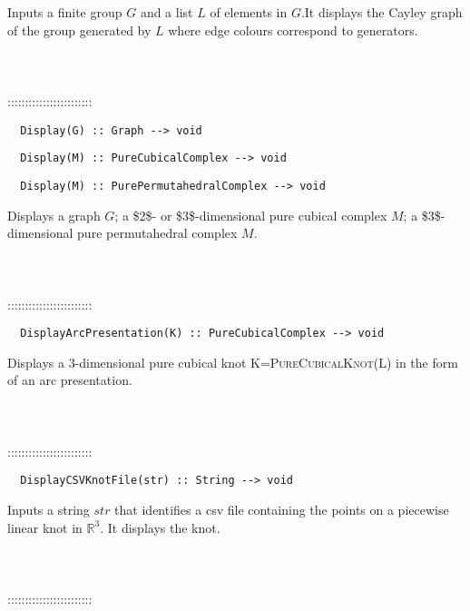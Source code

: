 \documentclass[a4paper,11pt]{report}
\begin{document}
{ 

 Inputs a finite group $G$ and a list $L$ of elements in $G$.It displays the Cayley graph of the group generated by $L$ where edge colours correspond to generators. \\
 \\
 \\
 \\
 ::::::::::::::::::::::::\\
 
\begin{verbatim}  Display(G) :: Graph --> void
\end{verbatim}
 
\begin{verbatim}  Display(M) :: PureCubicalComplex --> void
\end{verbatim}
 
\begin{verbatim}  Display(M) :: PurePermutahedralComplex --> void
\end{verbatim}


 

Displays a graph $G$; a \$2\$- or \$3\$-dimensional pure cubical complex $M$; a \$3\$-dimensional pure permutahedral complex $M$. \\
 \\
 \\
 \\
 ::::::::::::::::::::::::\\
 
\begin{verbatim}  DisplayArcPresentation(K) :: PureCubicalComplex --> void
\end{verbatim}


 

Displays a $3$-dimensional pure cubical knot \textsc{K=PureCubicalKnot(L)} in the form of an arc presentation. \\
 \\
 \\
 \\
 ::::::::::::::::::::::::\\
 
\begin{verbatim}  DisplayCSVKnotFile(str) :: String --> void
\end{verbatim}


 

Inputs a string $str$ that identifies a csv file containing the points on a piecewise linear knot in $\mathbb R^3$. It displays the knot. \\
 \\
 \\
 \\
 ::::::::::::::::::::::::\\
 
}
\end{document}
